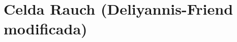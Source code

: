 \documentclass[../../tc_tp5_main.tex]{subfiles}
\begin{document}
\chapter{Celda Rauch (Deliyannis-Friend modificada)}


\clearpage\newpage
\end{document}
